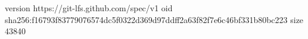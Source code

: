 version https://git-lfs.github.com/spec/v1
oid sha256:f16793f83779076574dc5f0322d369d97ddff2a63f82f7e6c46bf331b80bc223
size 43840
